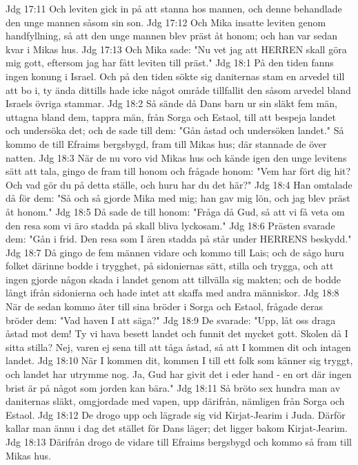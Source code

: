 Jdg 17:11  Och leviten gick in på att stanna hos mannen, och denne behandlade den unge mannen såsom sin son.
Jdg 17:12  Och Mika insatte leviten genom handfyllning, så att den unge mannen blev präst åt honom; och han var sedan kvar i Mikas hus.
Jdg 17:13  Och Mika sade: "Nu vet jag att HERREN skall göra mig gott, eftersom jag har fått leviten till präst."
Jdg 18:1  På den tiden fanns ingen konung i Israel. Och på den tiden sökte sig daniternas stam en arvedel till att bo i, ty ända dittills hade icke något område tillfallit den såsom arvedel bland Israels övriga stammar.
Jdg 18:2  Så sände då Dans barn ur sin släkt fem män, uttagna bland dem, tappra män, från Sorga och Estaol, till att bespeja landet och undersöka det; och de sade till dem: "Gån åstad och undersöken landet." Så kommo de till Efraims bergsbygd, fram till Mikas hus; där stannade de över natten.
Jdg 18:3  När de nu voro vid Mikas hus och kände igen den unge levitens sätt att tala, gingo de fram till honom och frågade honom: "Vem har fört dig hit? Och vad gör du på detta ställe, och huru har du det här?"
Jdg 18:4  Han omtalade då för dem: "Så och så gjorde Mika med mig; han gav mig lön, och jag blev präst åt honom."
Jdg 18:5  Då sade de till honom: "Fråga då Gud, så att vi få veta om den resa som vi äro stadda på skall bliva lyckosam."
Jdg 18:6  Prästen svarade dem: "Gån i frid. Den resa som I ären stadda på står under HERRENS beskydd."
Jdg 18:7  Då gingo de fem männen vidare och kommo till Lais; och de sågo huru folket därinne bodde i trygghet, på sidoniernas sätt, stilla och trygga, och att ingen gjorde någon skada i landet genom att tillvälla sig makten; och de bodde långt ifrån sidonierna och hade intet att skaffa med andra människor.
Jdg 18:8  När de sedan kommo åter till sina bröder i Sorga och Estaol, frågade deras bröder dem: "Vad haven I att säga?"
Jdg 18:9  De svarade: "Upp, låt oss draga åstad mot dem! Ty vi hava besett landet och funnit det mycket gott. Skolen då I sitta stilla? Nej, varen ej sena till att tåga åstad, så att I kommen dit och intagen landet.
Jdg 18:10  När I kommen dit, kommen I till ett folk som känner sig tryggt, och landet har utrymme nog. Ja, Gud har givit det i eder hand - en ort där ingen brist är på något som jorden kan bära."
Jdg 18:11  Så bröto sex hundra man av daniternas släkt, omgjordade med vapen, upp därifrån, nämligen från Sorga och Estaol.
Jdg 18:12  De drogo upp och lägrade sig vid Kirjat-Jearim i Juda. Därför kallar man ännu i dag det stället för Dans läger; det ligger bakom Kirjat-Jearim.
Jdg 18:13  Därifrån drogo de vidare till Efraims bergsbygd och kommo så fram till Mikas hus.
